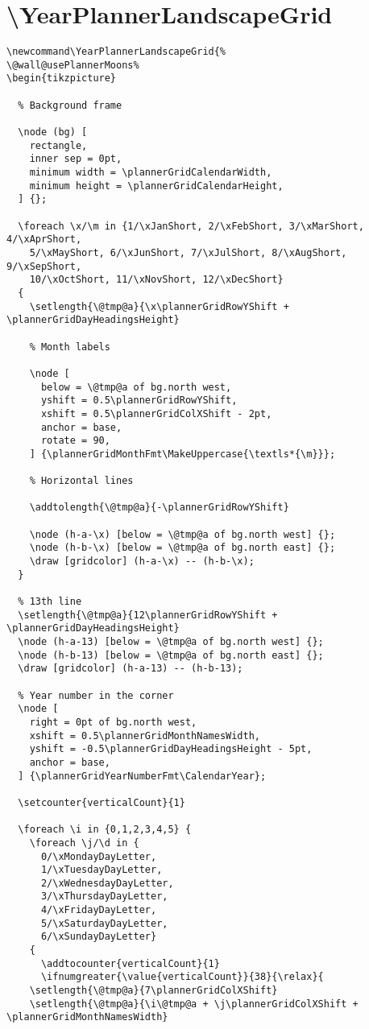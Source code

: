 \documentclass[11pt,oneside]{memoir-article}
\begin{document}
\section{\textbackslash YearPlannerLandscapeGrid}
\label{sec:orgeb59aed}

\begin{verbatim}
\newcommand\YearPlannerLandscapeGrid{%
\@wall@usePlannerMoons%
\begin{tikzpicture}

  % Background frame

  \node (bg) [
    rectangle,
    inner sep = 0pt,
    minimum width = \plannerGridCalendarWidth,
    minimum height = \plannerGridCalendarHeight,
  ] {};

  \foreach \x/\m in {1/\xJanShort, 2/\xFebShort, 3/\xMarShort, 4/\xAprShort,
    5/\xMayShort, 6/\xJunShort, 7/\xJulShort, 8/\xAugShort, 9/\xSepShort,
    10/\xOctShort, 11/\xNovShort, 12/\xDecShort}
  {
    \setlength{\@tmp@a}{\x\plannerGridRowYShift + \plannerGridDayHeadingsHeight}

    % Month labels

    \node [
      below = \@tmp@a of bg.north west,
      yshift = 0.5\plannerGridRowYShift,
      xshift = 0.5\plannerGridColXShift - 2pt,
      anchor = base,
      rotate = 90,
    ] {\plannerGridMonthFmt\MakeUppercase{\textls*{\m}}};

    % Horizontal lines

    \addtolength{\@tmp@a}{-\plannerGridRowYShift}

    \node (h-a-\x) [below = \@tmp@a of bg.north west] {};
    \node (h-b-\x) [below = \@tmp@a of bg.north east] {};
    \draw [gridcolor] (h-a-\x) -- (h-b-\x);
  }

  % 13th line
  \setlength{\@tmp@a}{12\plannerGridRowYShift + \plannerGridDayHeadingsHeight}
  \node (h-a-13) [below = \@tmp@a of bg.north west] {};
  \node (h-b-13) [below = \@tmp@a of bg.north east] {};
  \draw [gridcolor] (h-a-13) -- (h-b-13);

  % Year number in the corner
  \node [
    right = 0pt of bg.north west,
    xshift = 0.5\plannerGridMonthNamesWidth,
    yshift = -0.5\plannerGridDayHeadingsHeight - 5pt,
    anchor = base,
  ] {\plannerGridYearNumberFmt\CalendarYear};

  \setcounter{verticalCount}{1}

  \foreach \i in {0,1,2,3,4,5} {
    \foreach \j/\d in {
      0/\xMondayDayLetter,
      1/\xTuesdayDayLetter,
      2/\xWednesdayDayLetter,
      3/\xThursdayDayLetter,
      4/\xFridayDayLetter,
      5/\xSaturdayDayLetter,
      6/\xSundayDayLetter}
    {
      \addtocounter{verticalCount}{1}
      \ifnumgreater{\value{verticalCount}}{38}{\relax}{
	\setlength{\@tmp@a}{7\plannerGridColXShift}
	\setlength{\@tmp@a}{\i\@tmp@a + \j\plannerGridColXShift + \plannerGridMonthNamesWidth}


\end{verbatim}
\end{document}

